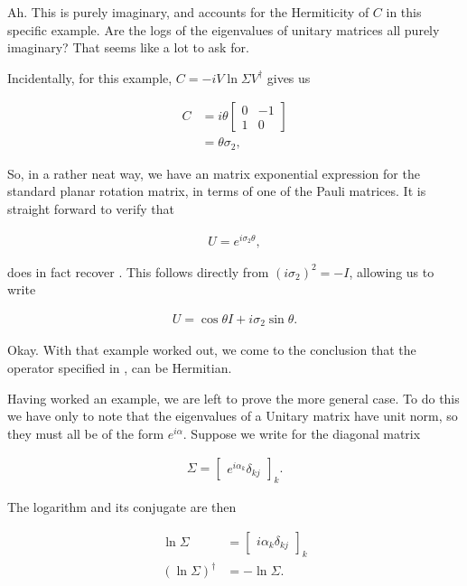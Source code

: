 Ah.  This is purely imaginary, and accounts for the Hermiticity of $C$ in this specific example.  Are the logs of the eigenvalues of unitary matrices all purely imaginary?  That seems like a lot to ask for.

Incidentally, for this example, $C = -i V \ln \Sigma V^\dagger$ gives us

\begin{align*}
C &= i \theta 
\begin{bmatrix}
0 & -1 \\
1 & 0
\end{bmatrix} \\
&= \theta \sigma_2,
\end{align*}

So, in a rather neat way, we have an matrix exponential expression for the standard planar rotation matrix, in terms of one of the Pauli matrices.  It is straight forward to verify that 

\begin{align}\label{eqn:desaiDiracNotes:13}
U = e^{i \sigma_2 \theta},
\end{align}

does in fact recover .  This follows directly from $(i \sigma_2)^2 = -I$, allowing us to write

\begin{align}\label{eqn:desaiDiracNotes:14}
U = \cos\theta I + i \sigma_2 \sin\theta.
\end{align}

Okay.  With that example worked out, we come to the conclusion that the operator specified in , can be Hermitian.

Having worked an example, we are left to prove the more general case.  To do this we have only to note that the eigenvalues of a Unitary matrix have unit norm, so they must all be of the form $e^{i\alpha}$.  Suppose we write for the diagonal matrix 

\begin{align}\label{eqn:desaiDiracNotes:11c}
\Sigma = 
{\begin{bmatrix}
e^{i\alpha_k} \delta_{kj}
\end{bmatrix}}_k.
\end{align}

The logarithm and its conjugate are then

\begin{align}\label{eqn:desaiDiracNotes:11d}
\ln \Sigma &= 
{\begin{bmatrix}
i\alpha_k \delta_{kj}
\end{bmatrix}}_k \\
(\ln \Sigma)^\dagger &= -\ln \Sigma.
\end{align}

